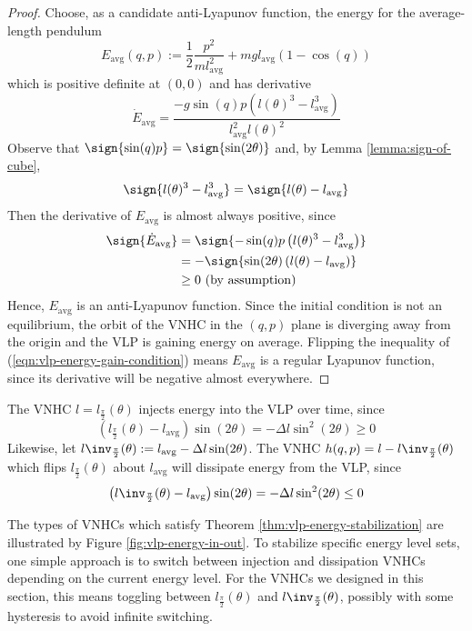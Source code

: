 \begin{proof}
    Choose, as a candidate anti-Lyapunov function, the energy for the average-length pendulum 
    \[
       E_\text{avg}(q,p) := \frac{1}{2}\frac{p^2}{m l_\text{avg}^2} 
                    + m g l_\text{avg} (1-\cos(q))
    \]
    which is positive definite at \((0,0)\) and has derivative 
    \[
      \dot{E}_\text{avg} = \frac{-g\sin(q)p \left(l(\theta)^3 - l_\text{avg}^3\right)}
                 {l_\text{avg}^2l(\theta)^2}
    \]
    Observe that \(\sign{\sin(q)p} = \sign{\sin(2\theta)}\) and, 
    by Lemma \ref{lemma:sign-of-cube},
    \[ 
       \sign{l(\theta)^3 - l_\text{avg}^3} = \sign{ l(\theta) - l_\text{avg}}
    \]
    Then the derivative of \(E_\text{avg}\) is almost always positive, since
    \begin{align*}
       \label{eq:}
       \sign{\dot{E}_\text{avg}} &= \sign{-\sin(q)p \left(l(\theta)^3 - l_\text{avg}^3\right)} \\
                   &= -\sign{\sin(2\theta) \left(l(\theta) - l_\text{avg}\right)} \\
                   &\geq 0 \text{ (by assumption)}
    \end{align*}
    Hence, \(E_\text{avg}\) is an anti-Lyapunov function.
    Since the initial condition is not an equilibrium,
    the orbit of the VNHC in the \((q,p)\) plane is diverging away from the
    origin and the VLP is gaining energy on average.
    Flipping the inequality of (\ref{eqn:vlp-energy-gain-condition}) 
    means \(E_\text{avg}\) is a regular Lyapunov function, since its derivative
    will be negative almost everywhere.
\end{proof}

\begin{cor}
   The VNHC \(l = l_\frac{\pi}{2}(\theta)\) injects energy into the VLP
   over time, since 
   \[
      \left(l_\frac{\pi}{2}(\theta) - l_\text{avg}\right)\sin(2\theta) = 
   -\Delta l \sin^2(2\theta) \geq 0
   \] 
   Likewise, let 
   \(l\inv_\frac{\pi}{2}(\theta) := l_\text{avg} - \Delta l \sin(2\theta)\).
    The VNHC \(h(q,p) = l - l\inv_\frac{\pi}{2}(\theta)\) which flips 
    \(l_\frac{\pi}{2}(\theta)\) about \(l_\text{avg}\) will dissipate energy from
   the VLP, since 
   \[
      \left(l\inv_\frac{\pi}{2}(\theta) - l_\text{avg}\right)\sin(2\theta) = 
      -\Delta l \sin^2(2\theta) \leq 0
   \] 
\end{cor}

The types of VNHCs which satisfy Theorem \ref{thm:vlp-energy-stabilization} are illustrated by Figure
\ref{fig:vlp-energy-in-out}. To stabilize specific energy level sets, one simple
approach is to switch between injection and dissipation VNHCs depending on the
current energy level.
For the VNHCs we designed in this section, this means toggling
between \(l_\frac{\pi}{2}(\theta)\) and \(l\inv_\frac{\pi}{2}(\theta)\),
possibly with some hysteresis to avoid infinite switching.  

